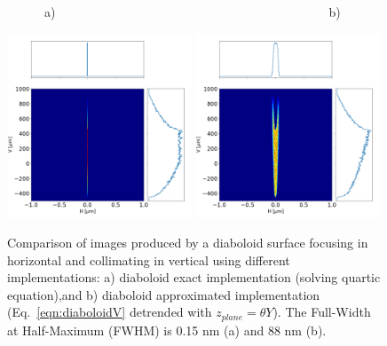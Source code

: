 \documentclass{iucr}              %
\begin{document}
\begin{figure}\label{fig:pointToSegment}
\flushleft
~~~~~~a)~~~~~~~~~~~~~~~~~~~~~~~~~~~~~~~~~~~~~~~~~~~~b)\\
\centering

\includegraphics[width=0.49\textwidth]{figures/p2s_V_z.png}
\includegraphics[width=0.49\textwidth]{figures/p2s_K_z.png} \\
\flushleft
\caption{Comparison of images produced by a diaboloid surface focusing in horizontal and collimating in vertical using different implementations: a) diaboloid exact implementation (solving quartic equation),and b) diaboloid approximated implementation (Eq.~\ref{eqn:diaboloidV} detrended with $z_{plane}=\theta Y$).
The Full-Width at Half-Maximum (FWHM) is 0.15 nm (a) and 88 nm (b). %
}
\end{figure}
\end{document}
